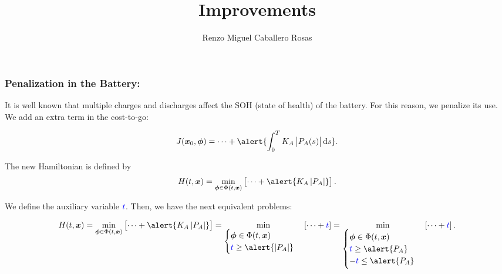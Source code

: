 \documentclass[aspectratio=169]{beamer}\usepackage[utf8]{inputenc}
\title{Improvements}
\subtitle{Renzo Miguel Caballero Rosas}
\begin{document}
\begin{frame}
\titlepage
\end{frame}

\begin{frame}\frametitle{Penalization in the Battery:}

It is well known that multiple charges and discharges affect the SOH (state of health) of the battery. For this reason, we penalize its use. We add an \alert{extra term} in the cost-to-go:

\begin{equation*}
J(\bm{x}_0,\bm{\phi})=\dots+\alert{\int_0^TK_A\left|P_A(s)\right|\dif s}.
\end{equation*}

The new Hamiltonian is defined by
\begin{equation*}
H(t,\bm{x})=\min_{\bm{\phi}\in\Phi(t,\bm{x})}\left[\dots+\alert{K_A\left|P_A\right|}\right].
\end{equation*}

We define the auxiliary variable ${\color{blue}t}$. Then, we have the next equivalent problems:

\begin{equation*}
H(t,\bm{x})=\min_{\bm{\phi}\in\Phi(t,\bm{x})}\left[\dots+\alert{K_A\left|P_A\right|}\right]=\min_{\begin{cases}\bm{\phi}\in\Phi(t,\bm{x})\\
{\color{blue}t}\geq\alert{\left|P_A\right|}\end{cases}}\left[\dots+{\color{blue}t}\right]=\min_{\begin{cases}\bm{\phi}\in\Phi(t,\bm{x})\\
{\color{blue}t}\geq\alert{P_A}\\
-{\color{blue}t}\leq\alert{P_A}\end{cases}}\left[\dots+{\color{blue}t}\right].
\end{equation*}


\end{frame}
\end{document}
